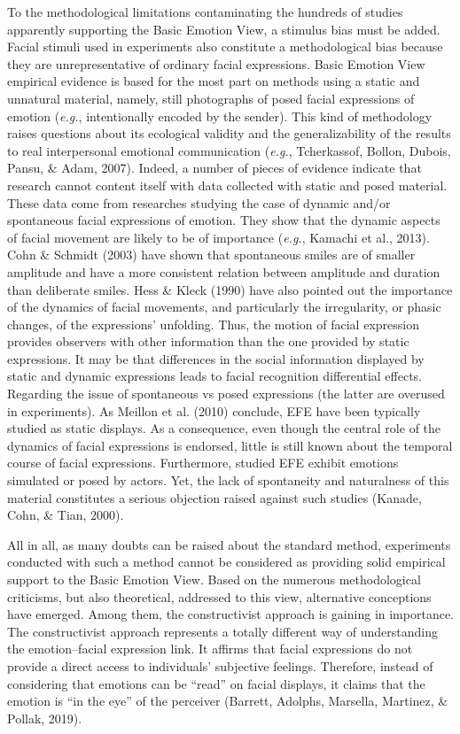 \documentclass[man]{apa6}
\begin{document}
To the methodological limitations contaminating the hundreds of studies apparently supporting the Basic Emotion View, a stimulus bias must be added. Facial stimuli used in experiments also constitute a methodological bias because they are unrepresentative of ordinary facial expressions. Basic Emotion View empirical evidence is based for the most part on methods using a static and unnatural material, namely, still photographs of posed facial expressions of emotion (\emph{e.g.}, intentionally encoded by the sender). This kind of methodology raises questions about its ecological validity and the generalizability of the results to real interpersonal emotional communication (\emph{e.g.}, Tcherkassof, Bollon, Dubois, Pansu, \& Adam, 2007). Indeed, a number of pieces of evidence indicate that research cannot content itself with data collected with static and posed material. These data come from researches studying the case of dynamic and/or spontaneous facial expressions of emotion. They show that the dynamic aspects of facial movement are likely to be of importance (\emph{e.g.}, Kamachi et al., 2013). Cohn \& Schmidt (2003) have shown that spontaneous smiles are of smaller amplitude and have a more consistent relation between amplitude and duration than deliberate smiles. Hess \& Kleck (1990) have also pointed out the importance of the dynamics of facial movements, and particularly the irregularity, or phasic changes, of the expressions' unfolding. Thus, the motion of facial expression provides observers with other information than the one provided by static expressions. It may be that differences in the social information displayed by static and dynamic expressions leads to facial recognition differential effects. Regarding the issue of spontaneous vs posed expressions (the latter are overused in experiments). As Meillon et al. (2010) conclude, EFE have been typically studied as static displays. As a consequence, even though the central role of the dynamics of facial expressions is endorsed, little is still known about the temporal course of facial expressions. Furthermore, studied EFE exhibit emotions simulated or posed by actors. Yet, the lack of spontaneity and naturalness of this material constitutes a serious objection raised against such studies (Kanade, Cohn, \& Tian, 2000).

All in all, as many doubts can be raised about the standard method, experiments conducted with such a method cannot be considered as providing solid empirical support to the Basic Emotion View. Based on the numerous methodological criticisms, but also theoretical, addressed to this view, alternative conceptions have emerged. Among them, the constructivist approach is gaining in importance. The constructivist approach represents a totally different way of understanding the emotion--facial expression link. It affirms that facial expressions do not provide a direct access to individuals' subjective feelings. Therefore, instead of considering that emotions can be \enquote{read} on facial displays, it claims that the emotion is \enquote{in the eye} of the perceiver (Barrett, Adolphs, Marsella, Martinez, \& Pollak, 2019).
\end{document}
